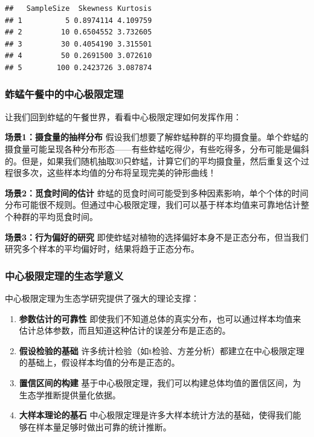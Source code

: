 \documentclass[
  twoside]{book}
\begin{document}
\begin{verbatim}
##   SampleSize  Skewness Kurtosis
## 1          5 0.8974114 4.109759
## 2         10 0.6504552 3.732605
## 3         30 0.4054190 3.315501
## 4         50 0.2691500 3.072610
## 5        100 0.2423726 3.087874
\end{verbatim}

\hypertarget{ux86b1ux8722ux5348ux9910ux4e2dux7684ux4e2dux5fc3ux6781ux9650ux5b9aux7406}{%
\subsubsection{蚱蜢午餐中的中心极限定理}\label{ux86b1ux8722ux5348ux9910ux4e2dux7684ux4e2dux5fc3ux6781ux9650ux5b9aux7406}}

让我们回到蚱蜢的午餐世界，看看中心极限定理如何发挥作用：

\textbf{场景1：摄食量的抽样分布}
假设我们想要了解蚱蜢种群的平均摄食量。单个蚱蜢的摄食量可能呈现各种分布形态------有些蚱蜢吃得少，有些吃得多，分布可能是偏斜的。但是，如果我们随机抽取30只蚱蜢，计算它们的平均摄食量，然后重复这个过程很多次，这些样本均值的分布将呈现完美的钟形曲线！

\textbf{场景2：觅食时间的估计}
蚱蜢的觅食时间可能受到多种因素影响，单个个体的时间分布可能很不规则。但通过中心极限定理，我们可以基于样本均值来可靠地估计整个种群的平均觅食时间。

\textbf{场景3：行为偏好的研究}
即使蚱蜢对植物的选择偏好本身不是正态分布，但当我们研究多个样本的平均偏好时，结果将趋于正态分布。

\hypertarget{ux4e2dux5fc3ux6781ux9650ux5b9aux7406ux7684ux751fux6001ux5b66ux610fux4e49}{%
\subsubsection{中心极限定理的生态学意义}\label{ux4e2dux5fc3ux6781ux9650ux5b9aux7406ux7684ux751fux6001ux5b66ux610fux4e49}}

中心极限定理为生态学研究提供了强大的理论支撑：

\begin{enumerate}
\def\labelenumi{\arabic{enumi}.}
\item
  \textbf{参数估计的可靠性}
  即使我们不知道总体的真实分布，也可以通过样本均值来估计总体参数，而且知道这种估计的误差分布是正态的。
\item
  \textbf{假设检验的基础}
  许多统计检验（如t检验、方差分析）都建立在中心极限定理的基础上，假设样本均值的分布是正态的。
\item
  \textbf{置信区间的构建}
  基于中心极限定理，我们可以构建总体均值的置信区间，为生态学推断提供量化依据。
\item
  \textbf{大样本理论的基石}
  中心极限定理是许多大样本统计方法的基础，使得我们能够在样本量足够时做出可靠的统计推断。
\end{enumerate}
\end{document}
